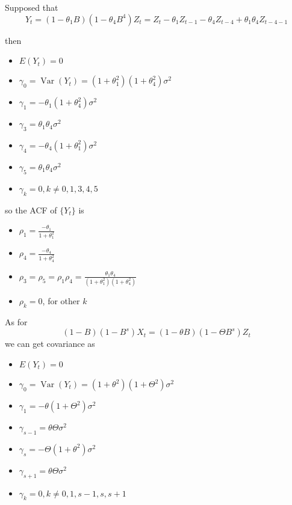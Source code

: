 \documentclass{article}
\begin{document}
\noindent Supposed that
\begin{equation*}
Y_{t}=(1-\theta_1 B)\left(1-\theta_4 B^{4}\right) Z_{t}=Z_{t}-\theta_1 Z_{t-1}-\theta_4 Z_{t-4} + \theta_1 \theta_4 Z_{t-4-1}
\end{equation*}

\noindent then
\begin{itemize}
	\item $E (Y_t) = 0$
	\item $\gamma_{0}=\operatorname{Var}\left(Y_{t}\right)=\left(1+\theta_1^{2}\right)\left(1+\theta_4^{2}\right) \sigma^{2}$
	\item $\gamma_{1}=-\theta_1\left(1+\theta_4^{2}\right) \sigma^{2}$
	\item $\gamma_{3}=\theta_1 \theta_4 \sigma^{2}$
	\item $\gamma_{4}=-\theta_4\left(1+\theta_1^{2}\right) \sigma^{2}$
	\item $\gamma_{5}=\theta_1 \theta_4 \sigma^{2}$
	\item $\gamma_{k}=0, k \neq 0, 1, 3, 4, 5$
\end{itemize}

\noindent so the ACF of $\{Y_t\}$ is
\begin{itemize}
	\item $\rho_{1}=\frac{-\theta_1}{1+\theta_1^{2}}$
	\item $\rho_{4}=\frac{-\theta_4}{1+\theta_4^{2}}$
	\item $\rho_{3}=\rho_{5}=\rho_{1} \rho_{4}=\frac{\theta_1 \theta_4}{\left(1+\theta_1^{2}\right)\left(1+\theta_4^{2}\right)}$
	\item $\rho_k = 0$, for other $k$
\end{itemize}

\noindent As for 
\begin{equation*}
(1-B)\left(1-B^{s}\right) X_{t}=(1-\theta B)\left(1-\Theta B^{s}\right) Z_{t}
\end{equation*}
we can get covariance as
\begin{itemize}
	\item $E (Y_t) = 0$
	\item $\gamma_{0}=\operatorname{Var}\left(Y_{t}\right)=\left(1+\theta^{2}\right)\left(1+\Theta^{2}\right) \sigma^{2}$
	\item $\gamma_{1}=-\theta\left(1+\Theta^{2}\right) \sigma^{2}$
	\item $\gamma_{s-1}=\theta \Theta \sigma^{2}$
	\item $\gamma_{s}=-\Theta\left(1+\theta^{2}\right) \sigma^{2}$
	\item $\gamma_{s+1}=\theta \Theta \sigma^{2}$
	\item $\gamma_{k}=0, k \neq 0, 1, s-1, s, s+1$
\end{itemize}
\end{document}
